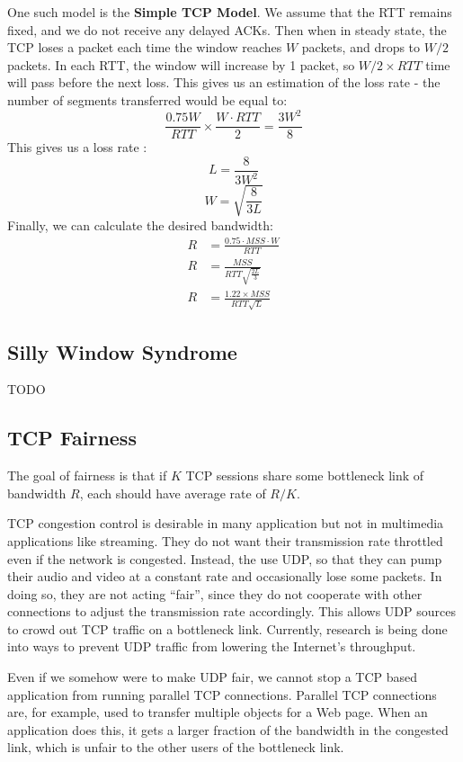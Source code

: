 \documentclass[12pt,letterpaper]{book}
\theoremstyle{definition}
\begin{document}
One such model is the \textbf{Simple TCP Model}. We assume that the RTT remains fixed, and we do not receive any delayed ACKs. Then when in steady state, the TCP loses a packet each time the window reaches $W$ packets, and drops to $W/2$ packets. In each RTT, the window will increase by 1 packet, so $W/2 \times RTT$ time will pass before the next loss. This gives us an estimation of the loss rate - the number of segments transferred would be equal to:
\[\frac{0.75 W}{RTT} \times \frac{W \cdot RTT}{2} = \frac{3W^2}{8}\]
This gives us a loss rate :
\[L = \frac{8}{3W^2}\]
\[W = \sqrt{\frac{8}{3L}}\]
Finally, we can calculate the desired bandwidth:
\begin{align*}
  R &= \frac{0.75 \cdot MSS \cdot W}{RTT} \\
  R &= \frac{MSS}{RTT \sqrt{\frac{2L}{3}}} \\
  R &= \frac{1.22 \times MSS}{RTT \sqrt{L}}
\end{align*}

\subsection{Silly Window Syndrome}

TODO

\subsection{TCP Fairness}

The goal of fairness is that if $K$ TCP sessions share some bottleneck link of bandwidth $R$, each should have average rate of $R/K$. 

TCP congestion control is desirable in many application but not in multimedia applications like streaming. They do not want their transmission rate throttled even if the network is congested. Instead, the use UDP, so that they can pump their audio and video at a constant rate and occasionally lose some packets. In doing so, they are not acting ``fair'', since they do not cooperate with other connections to adjust the transmission rate accordingly. This allows UDP sources to crowd out TCP traffic on a bottleneck link. Currently, research is being done into ways to prevent UDP traffic from lowering the Internet's throughput.

Even if we somehow were to make UDP fair, we cannot stop a TCP based application from running parallel TCP connections. Parallel TCP connections are, for example,  used to transfer multiple objects for a Web page. When an application does this, it gets a larger fraction of the bandwidth in the congested link, which is unfair to the other users of the bottleneck link.
\end{document}
